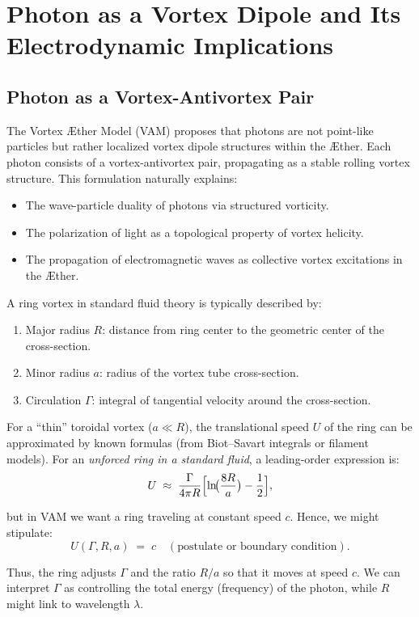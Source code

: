 
\section{Photon as a Vortex Dipole and Its Electrodynamic Implications}

\subsection{Photon as a Vortex-Antivortex Pair}
The Vortex \AE ther Model (VAM) proposes that photons are not point-like particles but rather localized vortex dipole structures within the \AE ther. Each photon consists of a vortex-antivortex pair, propagating as a stable rolling vortex structure. This formulation naturally explains:
\begin{itemize}
    \item The wave-particle duality of photons via structured vorticity.
    \item The polarization of light as a topological property of vortex helicity.
    \item The propagation of electromagnetic waves as collective vortex excitations in the \AE ther.
\end{itemize}

A ring vortex in standard fluid theory is typically described by:
\begin{enumerate}
    \item Major radius $R$: distance from ring center to the geometric center of the cross-section.
    \item Minor radius $a$: radius of the vortex tube cross-section.
    \item Circulation $\Gamma$: integral of tangential velocity around the cross-section.
\end{enumerate}

For a “thin” toroidal vortex ($ a \ll R$), the translational speed $U$ of the ring can be approximated by known formulas (from Biot–Savart integrals or filament models). For an \textit{unforced ring in a standard fluid}, a leading-order expression is:
$$ U
\;\approx\;
\frac{\Gamma}{4\pi R}
\Bigl[\ln\!\bigl(\frac{8R}{a}\bigr) - \frac{1}{2}\Bigr], $$

but in VAM we want a ring traveling at constant speed $c$. Hence, we might stipulate:
$$ U(\Gamma, R, a)
\;=\;
c
\quad
(\text{postulate or boundary condition}). $$

Thus, the ring adjusts $\Gamma$ and the ratio $R/a$ so that it moves at speed $c$. We can interpret $\Gamma$ as controlling the total energy (frequency) of the photon, while $R$ might link to wavelength $\lambda$.

